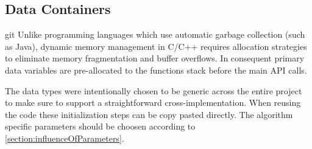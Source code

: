 \subsection{Data Containers}
\label{section:dataContainers}
git Unlike programming languages which use automatic garbage collection (such as Java), dynamic memory management in C/C++ requires allocation strategies to eliminate memory fragmentation and buffer overflows. In consequent primary data variables are pre-allocated to the functions stack before the main API calls.

The data types were intentionally chosen to be generic across the entire project to make sure to support a straightforward cross-implementation.
When reusing the code these initialization steps can be copy pasted directly. The algorithm specific parameters should be choosen according to \ref{section:influenceOfParameters}.